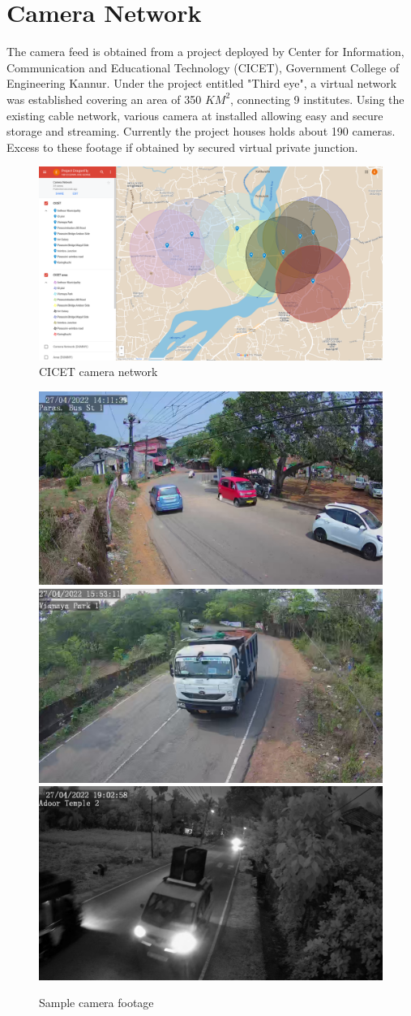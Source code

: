 \lipsum[1]


\section{Camera Network}
The camera feed is obtained from a project deployed by Center for Information, Communication and Educational Technology (CICET), Government College of Engineering Kannur. Under the project entitled "Third eye", a virtual network was established covering an area of 350 $KM^2$, connecting 9 institutes. Using the existing cable network, various camera at installed allowing easy and secure storage and streaming. Currently the project houses holds about 190 cameras. Excess to these footage if obtained by secured virtual private junction.

\begin{figure}[!ht]
	\centering
	\includegraphics[width=\linewidth]{Images/camera-network}
	\caption{CICET camera network}
	\label{fig:camera-network}
\end{figure}

\begin{figure}[!ht]
	\centering
	\includegraphics[width=0.32\linewidth]{Images/camera_footage/footage1} \hfill
	\includegraphics[width=0.32\linewidth]{Images/camera_footage/footage2} \hfill
	\includegraphics[width=0.32\linewidth]{Images/camera_footage/night1} \hfill
	\caption{Sample camera footage}
\end{figure}


